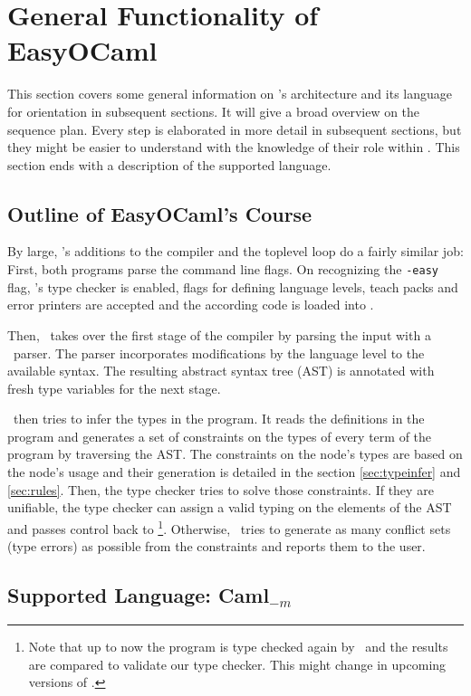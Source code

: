 
\section{General Functionality of EasyOCaml}
\label{sec:general}

This section covers some general information on \easyocaml's architecture and
its language for orientation in subsequent sections.
It will give a broad overview on the sequence plan.
Every step is elaborated in more detail in subsequent sections, but they might
be easier to understand with the knowledge of their role within \easyocaml.
This section ends with a description of the supported language.

\subsection{Outline of EasyOCaml's Course}

By large, \easyocaml's additions to the compiler and the toplevel loop do a
fairly similar job: First, both programs parse the command line flags.
On recognizing the \texttt{-easy} flag, \easyocaml's type checker is enabled,
flags for defining language levels, teach packs and error printers are accepted
and the according code is loaded into \easyocaml.

Then, \easyocaml\ takes over the first stage of the compiler by parsing the
input with a \camlpf\ parser. The parser incorporates modifications by the
language level to the available syntax. The resulting abstract syntax tree (AST)
is annotated with fresh type variables for the next stage.

\easyocaml\ then tries to infer the types in the program. It reads the definitions in
the program and generates a set of constraints on the types of every term of
the program by traversing the AST. The constraints on the node's types are based
on the node's usage and their generation is detailed in the section
\ref{sec:typeinfer} and \ref{sec:rules}.
Then, the type checker tries to solve those constraints. If they are unifiable,
the type checker can assign a valid typing on the elements of the AST and passes
control back to \ocaml\footnote{Note that up to now the program is type checked
again by \ocaml\ and the results are compared to validate our type checker. This
might change in upcoming versions of \easyocaml.}.
Otherwise, \easyocaml\ tries to generate as many conflict sets (type errors) as
possible from the constraints and reports them to the user.

\subsection{Supported Language: Caml$_{-m}$}
\label{sec:language}

